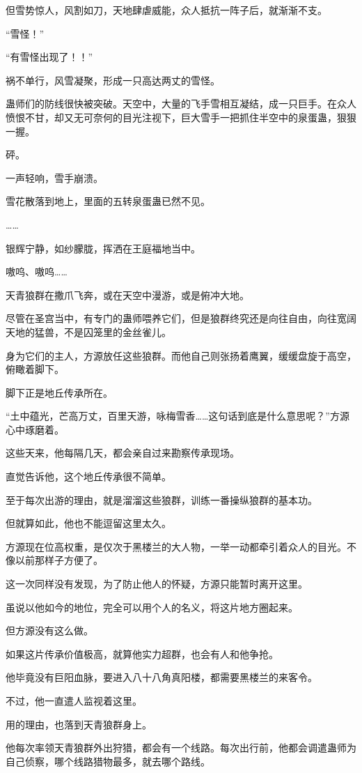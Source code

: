 \begin{this_body}
但雪势惊人，风割如刀，天地肆虐威能，众人抵抗一阵子后，就渐渐不支。

“雪怪！”

“有雪怪出现了！！”

祸不单行，风雪凝聚，形成一只高达两丈的雪怪。

蛊师们的防线很快被突破。天空中，大量的飞手雪相互凝结，成一只巨手。在众人愤恨不甘，却又无可奈何的目光注视下，巨大雪手一把抓住半空中的泉蛋蛊，狠狠一握。

砰。

一声轻响，雪手崩溃。

雪花散落到地上，里面的五转泉蛋蛊已然不见。

……

银辉宁静，如纱朦胧，挥洒在王庭福地当中。

嗷呜、嗷呜……

天青狼群在撒爪飞奔，或在天空中漫游，或是俯冲大地。

尽管在圣宫当中，有专门的蛊师喂养它们，但是狼群终究还是向往自由，向往宽阔天地的猛兽，不是囚笼里的金丝雀儿。

身为它们的主人，方源放任这些狼群。而他自己则张扬着鹰翼，缓缓盘旋于高空，俯瞰着脚下。

脚下正是地丘传承所在。

“土中蕴光，芒高万丈，百里天游，咏梅雪香……这句话到底是什么意思呢？”方源心中琢磨着。

这些天来，他每隔几天，都会亲自过来勘察传承现场。

直觉告诉他，这个地丘传承很不简单。

至于每次出游的理由，就是溜溜这些狼群，训练一番操纵狼群的基本功。

但就算如此，他也不能逗留这里太久。

方源现在位高权重，是仅次于黑楼兰的大人物，一举一动都牵引着众人的目光。不像以前那样子方便了。

这一次同样没有发现，为了防止他人的怀疑，方源只能暂时离开这里。

虽说以他如今的地位，完全可以用个人的名义，将这片地方圈起来。

但方源没有这么做。

如果这片传承价值极高，就算他实力超群，也会有人和他争抢。

他毕竟没有巨阳血脉，要进入八十八角真阳楼，都需要黑楼兰的来客令。

不过，他一直遣人监视着这里。

用的理由，也落到天青狼群身上。

他每次率领天青狼群外出狩猎，都会有一个线路。每次出行前，他都会调遣蛊师为自己侦察，哪个线路猎物最多，就去哪个路线。


\end{this_body}
